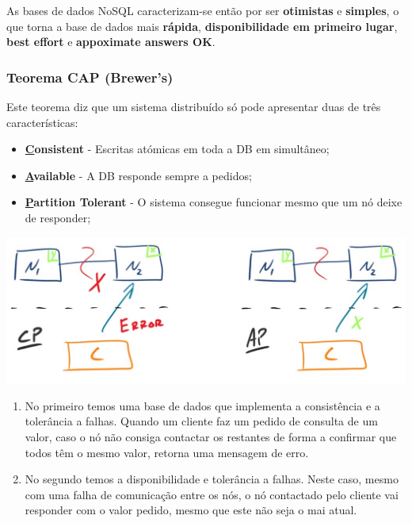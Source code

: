 \documentclass{article}
\begin{document}
As bases de dados NoSQL caracterizam-se então por ser \textbf{otimistas} e \textbf{simples}, o que torna a
base de dados mais \textbf{rápida}, \textbf{disponibilidade em primeiro lugar}, \textbf{best effort} e \textbf{appoximate answers OK}.

\pagebreak

\subsubsection{Teorema CAP (Brewer's)}

Este teorema diz que um sistema distribuído só pode apresentar duas de três características:

\begin{itemize}
  \item \textbf{\uline{C}onsistent} - Escritas atómicas em toda a DB em simultâneo;
  \item \textbf{\uline{A}vailable} - A DB responde sempre a pedidos;
  \item \textbf{\uline{P}artition Tolerant} - O sistema consegue funcionar mesmo que um nó deixe de responder;
\end{itemize}

\begin{center}
  \includegraphics[scale=0.3]{7}
\end{center}

\begin{flushleft}
  \begin{enumerate}
    \item No primeiro temos uma base de dados que implementa a consistência e a tolerância a falhas.
    Quando um cliente faz um pedido de consulta de um valor, caso o nó não consiga contactar os restantes de forma a
    confirmar que todos têm o mesmo valor, retorna uma mensagem de erro.
    \item No segundo temos a disponibilidade e tolerância a falhas. Neste caso, mesmo com uma falha de comunicação entre
    os nós, o nó contactado pelo cliente vai responder com o valor pedido, mesmo que este não seja o mai atual.
  \end{enumerate}
\end{flushleft}
\end{document}
